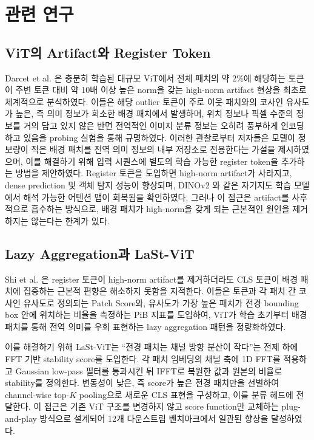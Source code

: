 \documentclass[10pt,twocolumn,letterpaper]{article}
\begin{document}
\section{관련 연구}

\subsection{ViT의 Artifact와 Register Token}

Darcet et al. \cite{darcet2024}은 충분히 학습된 대규모 ViT에서 전체 패치의 약 2\%에 해당하는 토큰이 주변 토큰 대비 약 10배 이상 높은 norm을 갖는 high-norm artifact 현상을 최초로 체계적으로 분석하였다. 이들은 해당 outlier 토큰이 주로 이웃 패치와의 코사인 유사도가 높은, 즉 의미 정보가 희소한 배경 패치에서 발생하며, 위치 정보나 픽셀 수준의 정보를 거의 담고 있지 않은 반면 전역적인 이미지 분류 정보는 오히려 풍부하게 인코딩하고 있음을 probing 실험을 통해 규명하였다. 이러한 관찰로부터 저자들은 모델이 정보량이 적은 배경 패치를 전역 의미 정보의 내부 저장소로 전용한다는 가설을 제시하였으며, 이를 해결하기 위해 입력 시퀀스에 별도의 학습 가능한 register token을 추가하는 방법을 제안하였다. Register 토큰을 도입하면 high-norm artifact가 사라지고, dense prediction 및 객체 탐지 성능이 향상되며, DINOv2 \cite{oquab2024}와 같은 자기지도 학습 모델에서 해석 가능한 어텐션 맵이 회복됨을 확인하였다. 그러나 이 접근은 artifact를 사후적으로 흡수하는 방식으로, 배경 패치가 high-norm을 갖게 되는 근본적인 원인을 제거하지는 않는다는 한계가 있다.

\subsection{Lazy Aggregation과 LaSt-ViT}

Shi et al. \cite{shi2026}은 register 토큰이 high-norm artifact를 제거하더라도 CLS 토큰이 배경 패치에 집중하는 근본적 편향은 해소하지 못함을 지적한다. 이들은 토큰과 각 패치 간 코사인 유사도로 정의되는 Patch Score와, 유사도가 가장 높은 패치가 전경 bounding box 안에 위치하는 비율을 측정하는 PiB 지표를 도입하여, ViT가 학습 초기부터 배경 패치를 통해 전역 의미를 우회 표현하는 lazy aggregation 패턴을 정량화하였다.

이를 해결하기 위해 LaSt-ViT는 ``전경 패치는 채널 방향 분산이 작다''는 전제 하에 FFT 기반 stability score를 도입한다. 각 패치 임베딩의 채널 축에 1D FFT를 적용하고 Gaussian low-pass 필터를 통과시킨 뒤 IFFT로 복원한 값과 원본의 비율로 stability를 정의한다. 변동성이 낮은, 즉 score가 높은 전경 패치만을 선별하여 channel-wise top-$K$ pooling으로 새로운 CLS 표현을 구성하고, 이를 분류 헤드에 전달한다. 이 접근은 기존 ViT 구조를 변경하지 않고 score function만 교체하는 plug-and-play 방식으로 설계되어 12개 다운스트림 벤치마크에서 일관된 향상을 달성하였다.
\end{document}

